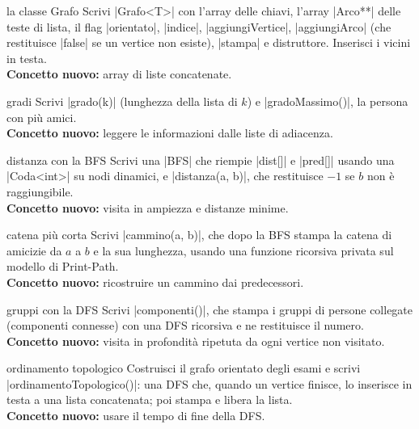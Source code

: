 \begin{step}{la classe Grafo}
Scrivi \cc|Grafo<T>| con l'array delle chiavi, l'array \cc|Arco**| delle teste di lista,
il flag \cc|orientato|, \cc|indice|, \cc|aggiungiVertice|, \cc|aggiungiArco| (che restituisce
\cc|false| se un vertice non esiste), \cc|stampa| e distruttore. Inserisci i vicini in
testa.\\[0.3em]
\textbf{Concetto nuovo:} array di liste concatenate.
\end{step}

\begin{step}{gradi}
Scrivi \cc|grado(k)| (lunghezza della lista di $k$) e \cc|gradoMassimo()|, la persona con
più amici.\\[0.3em]
\textbf{Concetto nuovo:} leggere le informazioni dalle liste di adiacenza.
\end{step}

\begin{step}{distanza con la BFS}
Scrivi una \cc|BFS| che riempie \cc|dist[]| e \cc|pred[]| usando una \cc|Coda<int>| su nodi
dinamici, e \cc|distanza(a, b)|, che restituisce $-1$ se $b$ non è raggiungibile.\\[0.3em]
\textbf{Concetto nuovo:} visita in ampiezza e distanze minime.
\end{step}

\begin{step}{catena più corta}
Scrivi \cc|cammino(a, b)|, che dopo la BFS stampa la catena di amicizie da $a$ a $b$ e la
sua lunghezza, usando una funzione ricorsiva privata sul modello di Print-Path.\\[0.3em]
\textbf{Concetto nuovo:} ricostruire un cammino dai predecessori.
\end{step}

\begin{step}{gruppi con la DFS}
Scrivi \cc|componenti()|, che stampa i gruppi di persone collegate (componenti connesse)
con una DFS ricorsiva e ne restituisce il numero.\\[0.3em]
\textbf{Concetto nuovo:} visita in profondità ripetuta da ogni vertice non visitato.
\end{step}

\begin{step}{ordinamento topologico}
Costruisci il grafo orientato degli esami e scrivi \cc|ordinamentoTopologico()|: una DFS
che, quando un vertice finisce, lo inserisce in testa a una lista concatenata; poi stampa
e libera la lista.\\[0.3em]
\textbf{Concetto nuovo:} usare il tempo di fine della DFS.
\end{step}

